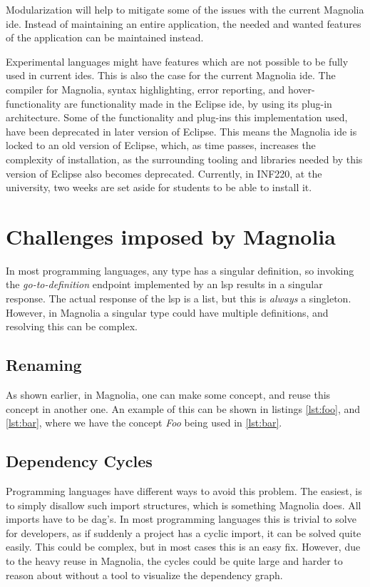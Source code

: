 Modularization will help to mitigate some of the issues with the current
Magnolia \gls{ide}. Instead of maintaining an entire application, the needed and
wanted features of the application can be maintained instead.

Experimental languages might have features which are not possible to be fully
used in current \gls{ide}s. This is also the case for the current Magnolia
\gls{ide}. The compiler for Magnolia, syntax highlighting, error reporting, and
hover-functionality are functionality made in the Eclipse \gls{ide}, by using
its plug-in architecture. Some of the functionality and plug-ins this
implementation used, have been deprecated in later version of Eclipse. This
means the Magnolia \gls{ide} is locked to an old version of Eclipse, which, as
time passes, increases the complexity of installation, as the surrounding
tooling and libraries needed by this version of Eclipse also becomes deprecated.
Currently, in INF220, at the university, two weeks are set aside for students to
be able to install it.

\section{Challenges imposed by Magnolia}

In most programming languages, any type has a singular definition, so invoking
the \textit{go-to-definition} endpoint implemented by an \gls{lsp} results in a
singular response. The actual response of the \gls{lsp} is a list, but this is
\textit{always} a singleton. However, in Magnolia a singular type could have
multiple definitions, and resolving this can be complex.

\subsection{Renaming}

As shown earlier, in Magnolia, one can make some concept, and reuse this concept
in another one. An example of this can be shown in listings \ref{lst:foo}, and
\ref{lst:bar}, where we have the concept \textit{Foo} being used in \ref{lst:bar}.

\subsection{Dependency Cycles}

Programming languages have different ways to avoid this problem.
The easiest, is to simply disallow such import structures, which is something
Magnolia does. All imports have to be \gls{dag}'s. In most programming languages
this is trivial to solve for developers, as if suddenly a project has a cyclic
import, it can be solved quite easily. This could be complex, but in most cases
this is an easy fix. However, due to the heavy reuse in Magnolia, the cycles
could be quite large and harder to reason about without a tool to visualize the
dependency graph.


